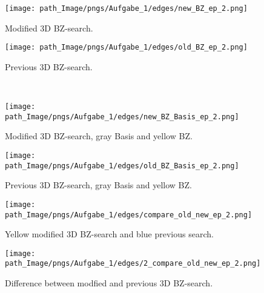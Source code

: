 \begin{figure}[!h]
\vspace{0.75cm}
\begin{minipage}{0.45\textwidth}
\centering
 \texttt{[image: path\_Image/pngs/Aufgabe\_1/edges/new\_BZ\_ep\_2.png]}
	\caption{Modified 3D BZ-search.} 
	\label{fig_edge_3d_BZsearch_modi}
\end{minipage}
\hfill
\begin{minipage}{0.45\textwidth}
\centering
 \texttt{[image: path\_Image/pngs/Aufgabe\_1/edges/old\_BZ\_ep\_2.png]}
	\caption{Previous 3D BZ-search.} 
	\label{fig_edge_3d_BZsearch_ohne}
\end{minipage}\\

\vspace{0.75 cm}
\begin{minipage}{0.45\textwidth}
\centering
 \texttt{[image: path\_Image/pngs/Aufgabe\_1/edges/new\_BZ\_Basis\_ep\_2.png]}
	\caption{Modified 3D BZ-search, gray Basis and yellow BZ.} 
	\label{fig_edge_3d_BZBasissearch_modi}
\end{minipage}
\hfill
\begin{minipage}{0.45\textwidth}
\centering
 \texttt{[image: path\_Image/pngs/Aufgabe\_1/edges/old\_BZ\_Basis\_ep\_2.png]}
	\caption{Previous 3D BZ-search, gray Basis and yellow BZ.} 
	\label{fig_edge_3d_BZBasissearch_ohne}
\end{minipage}
\end{figure}

\begin{figure}[!h]
\vspace{0.75 cm}
\begin{minipage}{0.45\textwidth}
\centering
 \texttt{[image: path\_Image/pngs/Aufgabe\_1/edges/compare\_old\_new\_ep\_2.png]}
	\caption{Yellow modified 3D BZ-search and blue previous search.} 
	\label{fig_edge_3d_compare_mod_old}
\end{minipage}
\hfill
\begin{minipage}{0.45\textwidth}
\centering
 \texttt{[image: path\_Image/pngs/Aufgabe\_1/edges/2\_compare\_old\_new\_ep\_2.png]}
	\caption{Difference between modfied and previous 3D BZ-search.} 
	\label{fig_edge_3d_2compare_mod_old}
\end{minipage}
\end{figure}
\newpage
 
